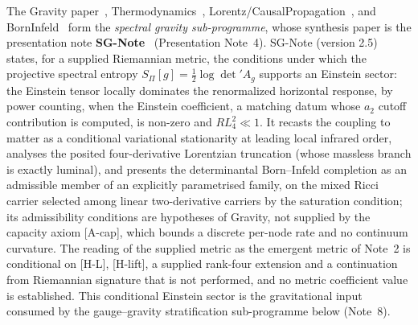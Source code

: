 \documentclass[11pt,a4paper]{article}
\begin{document}
    The Gravity paper~\cite{Beau2026h}, Thermodynamics~\cite{Beau2026Thermodynamics},
    Lorentz/CausalPropagation~\cite{Beau2026i}, and BornInfeld~\cite{Beau2026c} form the
    \emph{spectral gravity sub-programme}, whose synthesis paper is the presentation note
    \textbf{SG-Note}~\cite{Beau2026sgnote} (Presentation Note~4).
    SG-Note (version 2.5) states, for a supplied Riemannian metric, the conditions under which the projective
    spectral entropy $S_\Pi[g] = \tfrac{1}{2}\log\det' A_g$ supports an Einstein sector: the Einstein tensor
    locally dominates the renormalized horizontal response, by power counting, when the Einstein coefficient, a
    matching datum whose $a_2$ cutoff contribution is computed, is non-zero and $R L_4^2 \ll 1$.
    It recasts the coupling to matter as a conditional variational stationarity at leading local infrared
    order, analyses
    the posited four-derivative Lorentzian truncation (whose massless branch is exactly
    luminal), and presents the determinantal Born--Infeld completion as an admissible member
    of an explicitly parametrised family, on the mixed Ricci carrier selected among linear two-derivative carriers
    by the saturation condition; its admissibility conditions are hypotheses of Gravity, not supplied by the
    capacity axiom [A-cap], which bounds a discrete per-node rate and no continuum curvature.
    The reading of the supplied metric as the emergent metric of Note~2 is conditional on [H-L], [H-lift], a
    supplied rank-four extension and a continuation from Riemannian signature that is not performed,
    and no metric coefficient value is established.
    This conditional Einstein sector is the gravitational input consumed by the gauge--gravity
    stratification sub-programme below (Note~8).
\end{document}
